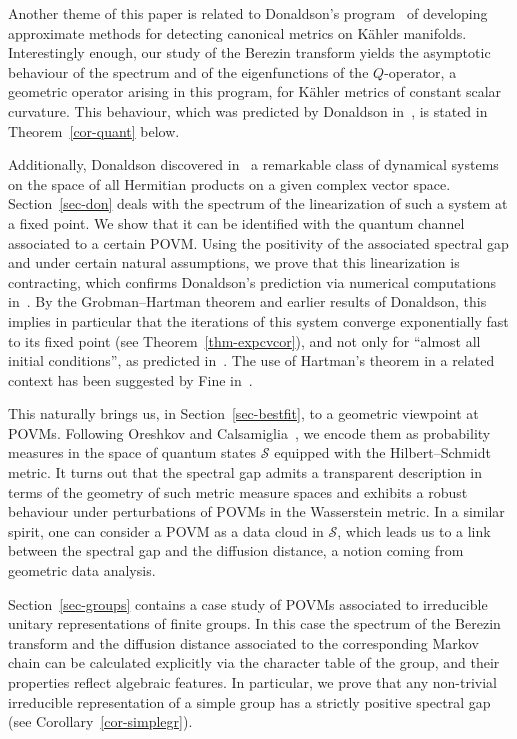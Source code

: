 \documentclass[11pt]{article}
\theoremstyle{definition}
\numberwithin{equation}{section}
\numberwithin{figure}{section}
\numberwithin{table}{section}
\newcommand{\cS}{{\mathcal{S}}}
\newcommand\< {\mathcal{h}}
\renewcommand\> {\mathcal{i}}
\begin{document}

Another theme of this paper is related to Donaldson's program~\cite{D} of developing approximate methods for detecting canonical metrics on K\"ahler manifolds. Interestingly enough, our study of the Berezin transform yields the asymptotic behaviour of the spectrum and of the eigenfunctions of the $Q$-operator, a geometric operator arising in this program, for K\"ahler metrics of constant scalar curvature. This behaviour, which was predicted by Donaldson in~\cite{D}, is stated in Theorem~\ref{cor-quant} below.

Additionally, Donaldson discovered in~\cite{D} a remarkable class of dynamical systems on the space of all Hermitian products on a given complex vector space. Section~\ref{sec-don} deals with the spectrum of the linearization of such a system at a fixed point. We show that it can be identified with the quantum channel associated to a certain POVM. Using the positivity of the associated spectral gap and under certain natural assumptions, we prove that this linearization is contracting, which confirms Donaldson's prediction via numerical computations in~\cite[Section~3]{D}. By the Grobman--Hartman theorem and earlier results of Donaldson, this implies in particular that the iterations of this system converge exponentially fast to its fixed point (see Theorem~\ref{thm-expcvcor}), and not only for ``almost all initial conditions'', as predicted in~\cite[Section~4.1]{D}. The use of Hartman's theorem in a related context has been suggested by Fine in~\cite{Fin12}.


This naturally brings us, in Section~\ref{sec-bestfit}, to a geometric viewpoint at POVMs. Following Oreshkov and Calsamiglia~\cite[VII.C]{OC}, we encode them as probability measures in the space of quantum states $\cS$ equipped with the Hilbert--Schmidt metric. It turns out that the spectral gap admits a transparent description in terms of the geometry of such metric measure spaces and exhibits a robust behaviour under perturbations of POVMs in the Wasserstein metric. In a similar spirit, one can consider a POVM as a data cloud in $\cS$, which leads us to a link between the spectral gap and the diffusion distance, a notion coming from geometric data analysis.

Section~\ref{sec-groups} contains a case study of POVMs associated to irreducible unitary representations of finite groups. In this case the spectrum of the Berezin transform and the diffusion distance associated to the corresponding Markov chain can be calculated explicitly via the character table of the group, and their properties reflect algebraic features. In particular, we prove that any non-trivial irreducible representation of a simple group has a strictly positive spectral gap (see Corollary~\ref{cor-simplegr}).
\end{document}
